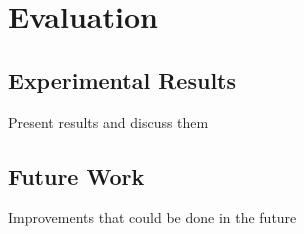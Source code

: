 \chapter{Evaluation}

\section{Experimental Results}
Present results and discuss them

\section{Future Work}

Improvements that could be done in the future